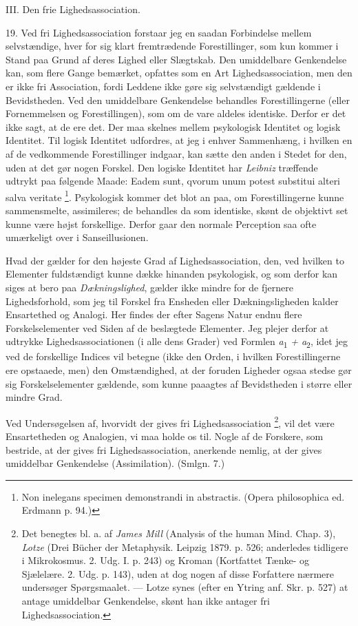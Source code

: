 \documentclass[12pt,a4paper,openany]{book}
\newcommand{\opage}[1]{\marginnote{\footnotesize\textit{[#1]}}}
\begin{document}
\begin{center}\large III. Den frie Lighedsassociation.\end{center}

19. Ved fri Lighedsassociation forstaar jeg en saadan Forbindelse mellem
selvstændige, hver for sig klart fremtrædende Forestillinger, som kun kommer i
Stand paa Grund af deres Lighed eller Slægtskab. Den umiddelbare Genkendelse
kan, som flere
\setcounter{footnote}{0}%
\opage{42}Gange bemærket, opfattes som en Art Lighedsassociation, men den er
ikke fri Association, fordi Leddene ikke gøre sig selvstændigt gældende i
Bevidstheden. Ved den umiddelbare Genkendelse behandles Forestillingerne (eller
Fornemmelsen og Forestillingen), som om de vare aldeles identiske. Derfor er
det ikke sagt, at de ere det. Der maa skelnes mellem psykologisk Identitet og
logisk Identitet. Til logisk Identitet udfordres, at jeg i enhver Sammenhæng, i
hvilken en af de vedkommende Forestillinger indgaar, kan sætte den anden i
Stedet for den, uden at det gør nogen Forskel. Den logiske Identitet har
\emph{Leibniz} træffende udtrykt paa følgende Maade: Eadem sunt, qvorum unum
potest substitui alteri salva veritate%
\footnote[1]{Non inelegans specimen demonstrandi in abstractis. (Opera
philosophica ed. Erdmann p. 94.)}. Psykologisk kommer det blot an paa, om
Forestillingerne kunne sammensmelte, assimileres; de behandles da som
identiske, skønt de objektivt set kunne være højst forskellige. Derfor gaar den
normale Perception saa ofte umærkeligt over i Sanseillusionen.

Hvad der gælder for den højeste Grad af Lighedsassociation, den, ved hvilken to
Elementer fuldstændigt kunne dække hinanden psykologisk, og som derfor kan
siges at bero paa \emph{Dækningslighed}, gælder ikke mindre for de fjernere
Lighedsforhold, som jeg til Forskel fra Ensheden eller Dækningsligheden kalder
Ensartethed og Analogi. Her findes der efter Sagens Natur endnu flere
Forskelselementer ved Siden af de beslægtede Elementer. Jeg plejer derfor at
udtrykke Lighedsassociationen (i alle dens Grader) ved Formlen
\textit{a}\textsubscript{1} \textit{ + a}\textsubscript{2}, idet jeg ved de
forskellige Indices vil betegne (ikke den Orden, i hvilken Forestillingerne ere
opstaaede, men) den Omstændighed, at der foruden Ligheder ogsaa stedse gør sig
Forskelselementer gældende, som kunne paaagtes af Bevidstheden i større eller
mindre Grad.

Ved Undersøgelsen af, hvorvidt der gives fri Lighedsassociation%
\footnote[2]{Det benegtes bl. a. af \emph{James Mill} (Analysis of the human
Mind. Chap. 3), \emph{Lotze} (Drei Bücher der Metaphysik. Leipzig 1879. p. 526;
anderledes tidligere i Mikrokosmus. 2. Udg. I. p. 243) og Kroman (Kortfattet
Tænke- og Sjælelære. 2. Udg. p. 143), uden at dog nogen af disse Forfattere
nærmere undersøger Spørgsmaalet. --- Lotze synes (efter en Ytring anf. Skr. p.
527) at antage umiddelbar Genkendelse, skønt han ikke antager fri
Lighedsassociation.}, vil det være Ensartetheden og Analogien, vi maa holde os
til. Nogle af de Forskere, som bestride, at der gives fri Lighedsassociation,
anerkende nemlig, at der gives umiddelbar Genkendelse (Assimilation). (Smlgn. 7.)
\end{document}
